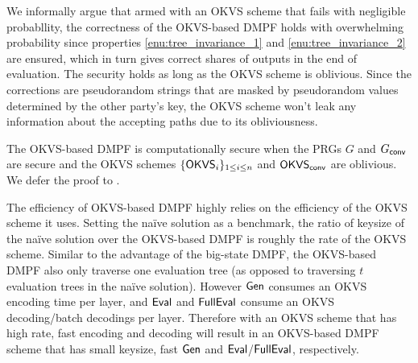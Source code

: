 

We informally argue that armed with an OKVS scheme that fails with negligible probabllity, the correctness of the OKVS-based DMPF holds with overwhelming probability since properties \ref{enu:tree_invariance_1} and \ref{enu:tree_invariance_2} are ensured, which in turn gives correct shares of outputs in the end of evaluation. The security holds as long as the OKVS scheme is oblivious. Since the corrections are pseudorandom strings that are masked by pseudorandom values determined by the other party's key, the OKVS scheme won't leak any information about the accepting paths due to its obliviousness. 

The OKVS-based DMPF is computationally secure when the PRGs $G$ and $G_{\sf conv}$ are secure and the OKVS schemes $\{{\sf OKVS}_i\}_{1\le i\le n}$ and ${\sf OKVS}_{\sf conv}$ are oblivious. We defer the proof to . 

The efficiency of OKVS-based DMPF highly relies on the efficiency of the OKVS scheme it uses. Setting the na\"ive solution as a benchmark, the ratio of keysize of the na\"ive solution over the OKVS-based DMPF is roughly the rate of the OKVS scheme. Similar to the advantage of the big-state DMPF, the OKVS-based DMPF also only traverse one evaluation tree (as opposed to traversing $t$ evaluation trees in the na\"ive solution). However ${\sf Gen}$ consumes an OKVS encoding time per layer, and ${\sf Eval}$ and ${\sf FullEval}$ consume an OKVS decoding/batch decodings per layer. Therefore with an OKVS scheme that has high rate, fast encoding and decoding will result in an OKVS-based DMPF scheme that has small keysize, fast ${\sf Gen}$ and ${\sf Eval}$/${\sf FullEval}$, respectively. 

